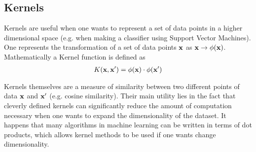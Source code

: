 \subsection{Kernels}
Kernels are useful when one wants to represent a set of data points in a higher dimensional space (e.g. when making a classifier using Support Vector Machines). One represents the transformation of a set of data points $\textbf{x}$ as $\textbf{x}\rightarrow \phi(\textbf{x})$. Mathematically a Kernel function is defined as
\begin{align}
	K(\textbf{x},\textbf{x}') = \phi(\textbf{x})\cdot \phi(\textbf{x}')
\end{align}

 Kernels themselves are a measure of similarity between two different points of data $\textbf{x}$ and $\textbf{x}'$ (e.g. cosine similarity). Their main utility lies in the fact that cleverly defined kernels can significantly reduce the amount of computation necessary when one wants to expand the dimensionality of the dataset. It happens that many algorithms in machine learning can be written in terms of dot products, which allows kernel methods to be used if one wants change dimensionality.

